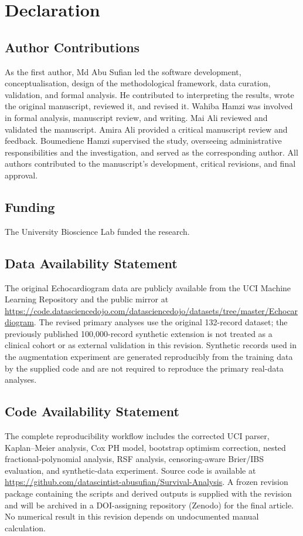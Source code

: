 \documentclass[a4paper,12pt]{article}
\begin{document}
\section{Declaration}
\subsection*{Author Contributions}
As the first author, Md Abu Sufian led the software development, conceptualisation, design of the methodological framework, data curation, validation, and formal analysis. He contributed to interpreting the results, wrote the original manuscript, reviewed it, and revised it. Wahiba Hamzi was involved in formal analysis, manuscript review, and writing. Mai Ali reviewed and validated the manuscript. Amira Ali provided a critical manuscript review and feedback. Boumediene Hamzi supervised the study, overseeing administrative responsibilities and the investigation, and served as the corresponding author. All authors contributed to the manuscript's development, critical revisions, and final approval.

\subsection*{Funding}
The University Bioscience Lab funded the research.

\subsection*{Data Availability Statement}
The original Echocardiogram data are publicly available from the UCI Machine Learning Repository \cite{ref44} and the public mirror at \url{https://code.datasciencedojo.com/datasciencedojo/datasets/tree/master/Echocardiogram}. The revised primary analyses use the original 132-record dataset; the previously published 100,000-record synthetic extension is not treated as a clinical cohort or as external validation in this revision. Synthetic records used in the augmentation experiment are generated reproducibly from the training data by the supplied code and are not required to reproduce the primary real-data analyses.

\subsection*{Code Availability Statement}
The complete reproducibility workflow includes the corrected UCI parser, Kaplan--Meier analysis, Cox PH model, bootstrap optimism correction, nested fractional-polynomial analysis, RSF analysis, censoring-aware Brier/IBS evaluation, and synthetic-data experiment. Source code is available at \url{https://github.com/datascintist-abusufian/Survival-Analysis}. A frozen revision package containing the scripts and derived outputs is supplied with the revision and will be archived in a DOI-assigning repository (Zenodo) for the final article. No numerical result in this revision depends on undocumented manual calculation.
\end{document}
